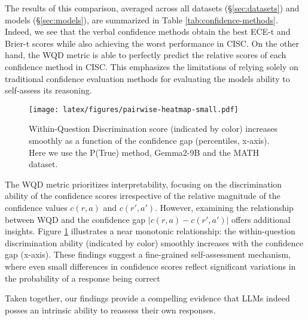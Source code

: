 The results of this comparison, averaged across all datasets (\S\ref{sec:datasets}) and models (\S\ref{sec:models}), are summarized in Table \ref{tab:confidence-methods}.  
Indeed, we see that the verbal confidence methods obtain the best ECE-t and Brier-t scores while also achieving the worst performance in CISC. On the other hand, the WQD metric is able to perfectly predict the relative scores of each confidence method in CISC. This emphasizes the limitations of relying solely on traditional confidence evaluation methods for evaluating the models ability to self-assess its reasoning.

\begin{figure}[!h]
    \centering
    \texttt{[image: latex/figures/pairwise-heatmap-small.pdf]}
    \caption{Within-Question Discrimination score (indicated by color) increases smoothly as a function of the confidence gap (percentiles, x-axis). Here we use the P(True) method, Gemma2-9B and the MATH dataset. 
    } %
\label{fig:pairwise-heatmap}
\end{figure}

The WQD metric prioritizes interpretability, focusing on the discrimination ability of the confidence scores irrespective of the relative magnitude of the confidence values $c(r,a)$ and $c(r', a')$. However, examining the relationship between WQD and the confidence gap $|c(r,a) - c(r',a')|$ offers additional insights. Figure \ref{fig:pairwise-heatmap} illustrates a near monotonic relationship: the within-question discrimination ability (indicated by color) smoothly increases with the confidence gap (x-axis).
These findings suggest a fine-grained self-assessment mechanism, where even small differences in confidence scores reflect significant variations in the probability of a response being correct

Taken together, our findings provide a compelling evidence that LLMs indeed posses an intrinsic ability to reassess their own responses.
